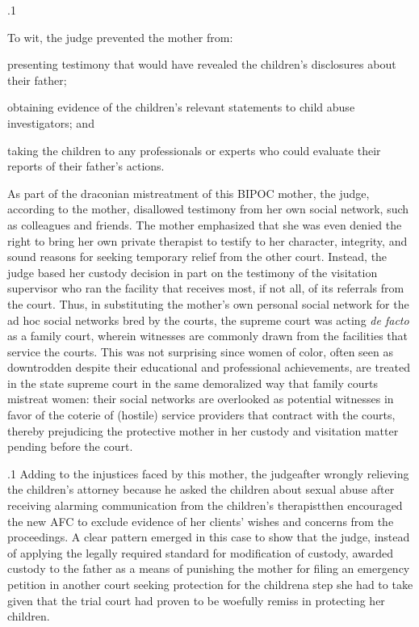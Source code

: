 \documentclass[11pt, twoside]{article}
\begin{document}
{\p.1{%
To wit, the judge prevented the mother from:

\begin{docEnumerate}[\hspace{10pt}1)]

\item{} presenting testimony that would have revealed the children’s
disclosures about their father;
\item{} obtaining evidence of the children’s relevant statements to
child abuse investigators; and
\item{} taking the children to any professionals or experts who could
evaluate their reports of their father’s actions.

\end{docEnumerate}

\nip{}%
As part of the draconian mistreatment of this BIPOC mother, the judge,
according to the mother, disallowed testimony from her own
social network, such as colleagues and friends. The mother emphasized that she
was even denied the right to bring her own private therapist to testify to
her character, integrity, and sound reasons for seeking temporary relief
from the other court. Instead, the judge based her custody decision in
part on the testimony of the visitation supervisor who ran the facility
that receives most, if not all, of its referrals from the court. Thus, in substituting the mother’s own personal social network for the ad hoc social
networks bred by the courts, the supreme court was acting \textit{de facto} as a
family court, wherein witnesses are commonly drawn from the facilities
that service the courts. This was not surprising since women of color,
often seen as downtrodden despite their educational and professional
achievements, are treated in the state supreme court in the same demoralized way that family courts mistreat women: their social networks
are overlooked as potential witnesses in favor of the coterie of (hostile)
service providers that contract with the courts, thereby prejudicing the
protective mother in her custody and visitation matter pending before
the court.
}%

\p.1{%
Adding to the injustices faced by this mother, the judge\mdash{}after
wrongly relieving the children’s attorney because he asked the children
about sexual abuse after receiving alarming communication from the
children’s therapist\mdash{}then encouraged the new AFC to exclude evidence
of her clients’ wishes and concerns from the proceedings. A clear pattern emerged in this case to show that the judge, instead of applying the
legally required standard for modification of custody, awarded custody
to the father as a means of punishing the mother for filing an emergency petition in another court seeking protection for the children\mdash{}a
step she had to take given that the trial court had proven to be woefully
remiss in protecting her children.
}%

}
\end{document}
